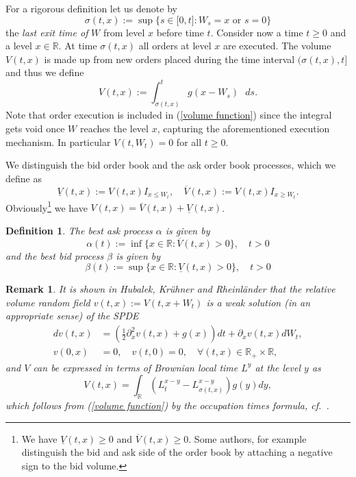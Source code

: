 \documentclass[11pt]{scrartcl}
\newtheorem{definition}[theorem]{Definition}
\newtheorem{remark}[theorem]{Remark}
\begin{document}
For a rigorous definition let us denote by 
\begin{equation}
\sigma (t,x):=\sup \{s\in \lbrack 0,t]:\mbox{$W_s=x$ or $s=0$}\}
\end{equation}%
the \emph{last exit time of} $W$ from level $x$ before time $t$. Consider
now a time $t\geq 0$ and a level $x\in \mathbb{R}$. At time $\sigma (t,x)$
all orders at level $x$ are executed. The volume $V(t,x)$ is made up from
new orders placed during the time interval $(\sigma (t,x),t]$ and thus we
define 
\begin{equation}
V(t,x):=\int_{\sigma (t,x)}^{t}g(x-W_{s})\text{ }ds.  \label{volume function}
\end{equation}%
Note that order execution is included in (\ref{volume function}) since the
integral gets void once $W$ reaches the level $x$, capturing the
aforementioned execution mechanism. In particular $V(t,W_{t})=0$ for all $%
t\geq 0$.

We distinguish the bid order book and the ask order book processes, which we
define as 
\begin{equation}
\underline{V}(t,x):=V(t,x)I_{x\leq W_{t}},\quad \overline{V}%
(t,x):=V(t,x)I_{x\geq W_{t}}.  \label{bid-ask}
\end{equation}%
Obviously\footnote{%
We have $\underline{V}(t,x)\geq 0$ and $\overline{V}(t,x)\geq 0$. Some
authors, for example \cite[Sec.1.1, p.550]{CST} distinguish the bid and ask
side of the order book by attaching a negative sign to the bid volume.} we
have $V(t,x)=\overline{V}(t,x)+\underline{V}(t,x)$.

\begin{definition}
The \emph{best ask process} $\alpha$ is given by 
\begin{equation}  \label{alpha}
\alpha(t) := \inf\{ x\in\mathbb{R}: \overline V(t,x) > 0 \},\quad t> 0
\end{equation}
and the \emph{best bid process} $\beta$ is given by 
\begin{equation}  \label{beta}
\beta(t) := \sup\{ x\in\mathbb{R}: \underline V(t,x) > 0 \},\quad t> 0
\end{equation}
\end{definition}
\begin{remark}
It is shown in Hubalek, Krühner and Rheinländer \cite{HKR-SPDE} that
the relative volume random field $v\left( t,x\right) :=V\left(
t,x+W_{t}\right) $ is a weak solution (in an appropriate sense) of the SPDE%
\begin{align}
dv(t,x)& =\left( \frac{1}{2}\partial _{x}^{2}v(t,x)+g(x)\right) dt+\partial
_{x}v(t,x)dW_{t},  \label{dv(t,x)} \\
v(0,x)& =0,\quad v(t,0)=0,\quad\forall(t,x)\in\mathbb R_+\times\mathbb R,
\end{align}%
and $V$ can be expressed in terms of Brownian local time $L^{y}$ at the
level $y$ as 
\begin{equation}
V(t,x)=\int_{\mathbb{R}}\left( L_{t}^{x-y}-L_{\sigma (t,x)}^{x-y}\right)
g(y)dy,  \label{V-Wiener specific}
\end{equation}
which follows from (\ref{volume function}) by the occupation times formula, cf.\ \cite[Corollary VI.1.6]{RY}.
\end{remark}
%
\end{document}
